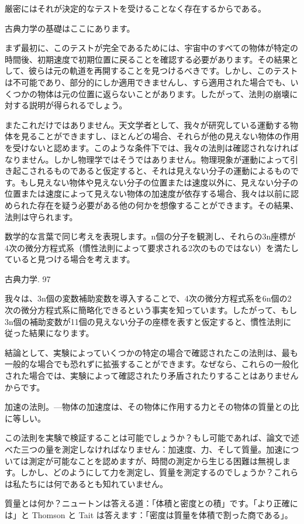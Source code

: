 \documentclass[a4paper,11pt,openany]{ltjsbook}
\begin{document}
厳密にはそれが決定的なテストを受けることなく存在するからである。

古典力学の基礎はここにあります。

まず最初に、このテストが完全であるためには、宇宙中のすべての物体が特定の時間後、初期速度で初期位置に戻ることを確認する必要があります。その結果として、彼らは元の軌道を再開することを見つけるべきです。しかし、このテストは不可能であり、部分的にしか適用できませんし、すら適用された場合でも、いくつかの物体は元の位置に返らないことがあります。したがって、法則の崩壊に対する説明が得られるでしょう。

またこれだけではありません。天文学者として、我々が研究している運動する物体を見ることができますし、ほとんどの場合、それらが他の見えない物体の作用を受けないと認めます。このような条件下では、我々の法則は確認されなければなりません。しかし物理学ではそうではありません。物理現象が運動によって引き起こされるものであると仮定すると、それは見えない分子の運動によるものです。もし見えない物体や見えない分子の位置または速度以外に、見えない分子の位置または速度によって見えない物体の加速度が依存する場合、我々は以前に認められた存在を疑う必要がある他の何かを想像することができます。その結果、法則は守られます。

数学的な言葉で同じ考えを表現します。n個の分子を観測し、それらの3n座標が4次の微分方程式系（慣性法則によって要求される2次のものではない）を満たしていると見つける場合を考えます。

古典力学. 97

我々は、3n個の変数補助変数を導入することで、4次の微分方程式系を6n個の2次の微分方程式系に簡略化できるという事実を知っています。したがって、もし3n個の補助変数が11個の見えない分子の座標を表すと仮定すると、慣性法則に従った結果になります。

結論として、実験によっていくつかの特定の場合で確認されたこの法則は、最も一般的な場合でも恐れずに拡張することができます。なぜなら、これらの一般化された場合では、実験によって確認されたり矛盾されたりすることはありませんからです。

加速の法則。—物体の加速度は、その物体に作用する力とその物体の質量との比に等しい。

この法則を実験で検証することは可能でしょうか？もし可能であれば、論文で述べた三つの量を測定しなければなりません：加速度、力、そして質量。加速については測定が可能なことを認めますが、時間の測定から生じる困難は無視します。しかし、どのようにして力を測定し、質量を測定するのでしょうか？これらは私たちには何であるとも知れていません。

質量とは何か？ニュートンは答える道：「体積と密度との積」です。「より正確には」と Thomson と Tait は答えます：「密度は質量を体積で割った商である」。
\end{document}

